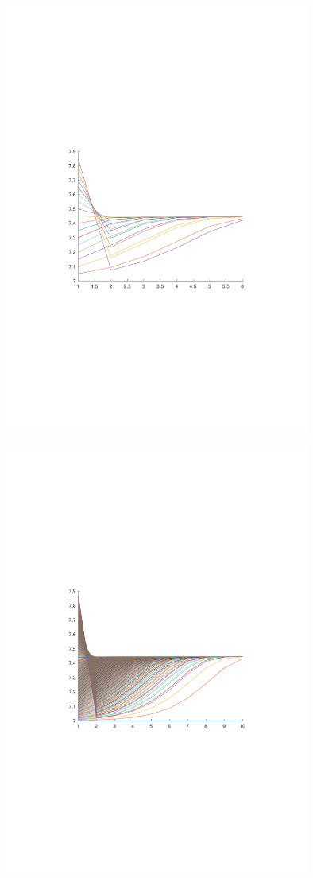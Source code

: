\begin{figure}[H]
\centering
\includegraphics[width=10cm]{fig/2_1.pdf}
\end{figure}

\begin{figure}[H]
\centering
\includegraphics[width=10cm]{fig/2_2.pdf}
\end{figure}







